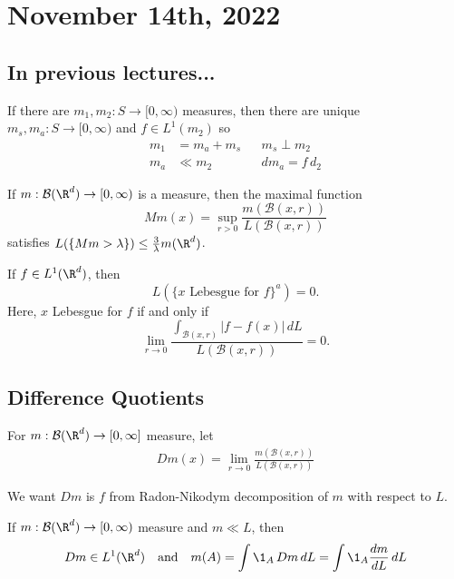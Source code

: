 \section{November 14th, 2022}

\subsection*{In previous lectures...}

\begin{theorem}
	If there are $m_1, m_2 : S \to [0, \infty)$ measures, then there are unique $m_s, m_a : S \to [0, \infty)$ and $f \in L^{1} (m_2)$ so
	\begin{align*}
		m_1 &= m_a + m_s && m_s \perp m_2 \\
		m_a &\ll m_2 && dm_a = f \, d_2
	\end{align*}
\end{theorem}

\begin{theorem}
	If $m : \mathcal{B}(\R^d) \to [0, \infty)$ is a measure, then the maximal function
	\[
		Mm(x) = \sup_{r > 0} \frac{m(\mathcal{B}(x,r))}{L(\mathcal{B}(x,r))}
	\]
	satisfies $L(\{ Mm > \lambda \} ) \leq \frac{3}{\lambda}m(\R^d)$.
\end{theorem}

\begin{theorem}
	If $f \in L^{1} (\R^d)$, then
	\[
		L(\{ x \textrm{ Lebesgue for } f \}^a) = 0.
	\]
	Here, $x$ Lebesgue for $f$ if and only if
	\[
		\lim_{r \to 0} \frac{\int_{\mathcal{B}(x,r)} |f - f(x)| \, dL}{L(\mathcal{B}(x,r))} = 0.
	\]
\end{theorem}

\subsection{Difference Quotients}

\begin{definition}
	For $m: \mathcal{B}(\R^d) \to [0, \infty]$ measure,
	let
	\begin{align*}
		D m (x) = \lim_{r \to 0} \frac{m ( \mathcal{B} (x, r))}{L(\mathcal{B}(x, r))}
	\end{align*}
\end{definition}

\noindent We want $D m$ is $f$ from Radon-Nikodym decomposition of $m$ with respect to $L$.

\begin{theorem}
	If $m: \mathcal{B}(\R^d) \to [0, \infty)$ measure and $m \ll L$, then
	\begin{align*}
    D m \in L^{1} (\R^d) \quad \text{and} \quad m(A) = \int \1_A \, Dm \, dL = \int \1_A \frac{dm}{dL} \, dL
	\end{align*}
\end{theorem}

